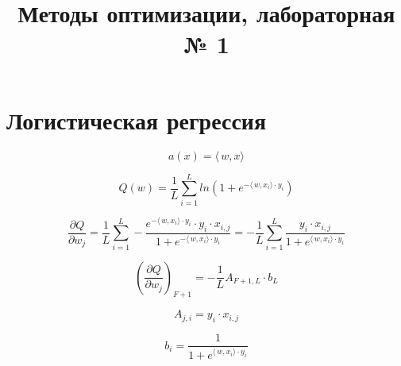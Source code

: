 \documentclass[12pt]{article}
\title{Методы оптимизации, лабораторная № 1}
\begin{document}
	\maketitle
	
\section{Логистическая регрессия}
$$a(x) = \langle\,w,x\rangle$$

$$Q(w) = \frac{1}{L}\sum\limits_{i = 1}^L ln(1 + e^{-\langle\,w,x_i\rangle\cdot y_i})$$

$$\frac{\partial Q}{\partial w_j} = \frac{1}{L}\sum\limits_{i = 1}^{L}-\frac{e^{-\langle\,w,x_i\rangle\cdot y_i} \cdot y_i \cdot x_{i, j}}{1 + e^{-\langle\,w,x_i\rangle\cdot y_i}} = -\frac{1}{L}\sum\limits_{i = 1}^{L}\frac{y_i \cdot x_{i, j}}{1 + e^{\langle\,w,x_i\rangle\cdot y_i}} $$

\[ 
\left( \frac{\partial Q}{\partial w_j} \right)_{F+1} =-\frac{1}{L} A_{F+1, L} \cdot b_{L}
\]

$$A_{j, i} = y_{i} \cdot x_{i, j}$$

$$b_i = \frac{1}{1 + e^{\langle\,w,x_i\rangle\cdot y_i}}$$
\end{document}
